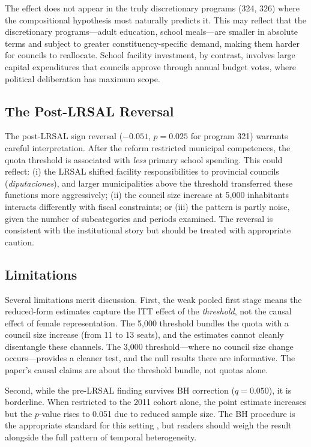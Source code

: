 \documentclass[12pt]{article}
\begin{document}
The effect does not appear in the truly discretionary programs (324, 326) where the compositional hypothesis most naturally predicts it. This may reflect that the discretionary programs---adult education, school meals---are smaller in absolute terms and subject to greater constituency-specific demand, making them harder for councils to reallocate. School facility investment, by contrast, involves large capital expenditures that councils approve through annual budget votes, where political deliberation has maximum scope.

\subsection{The Post-LRSAL Reversal}

The post-LRSAL sign reversal ($-0.051$, $p = 0.025$ for program 321) warrants careful interpretation. After the reform restricted municipal competences, the quota threshold is associated with \emph{less} primary school spending. This could reflect: (i) the LRSAL shifted facility responsibilities to provincial councils (\emph{diputaciones}), and larger municipalities above the threshold transferred these functions more aggressively; (ii) the council size increase at 5,000 inhabitants interacts differently with fiscal constraints; or (iii) the pattern is partly noise, given the number of subcategories and periods examined. The reversal is consistent with the institutional story but should be treated with appropriate caution.

\subsection{Limitations}

Several limitations merit discussion. First, the weak pooled first stage means the reduced-form estimates capture the ITT effect of the \emph{threshold}, not the causal effect of female representation. The 5,000 threshold bundles the quota with a council size increase (from 11 to 13 seats), and the estimates cannot cleanly disentangle these channels. The 3,000 threshold---where no council size change occurs---provides a cleaner test, and the null results there are informative. The paper's causal claims are about the threshold bundle, not quotas alone.

Second, while the pre-LRSAL finding survives BH correction ($q = 0.050$), it is borderline. When restricted to the 2011 cohort alone, the point estimate increases but the $p$-value rises to 0.051 due to reduced sample size. The BH procedure is the appropriate standard for this setting \citep{anderson2008multiple}, but readers should weigh the result alongside the full pattern of temporal heterogeneity.
\end{document}
